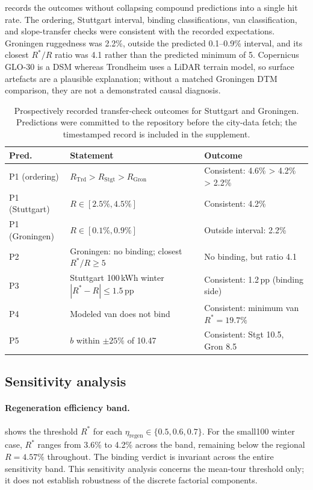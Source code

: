 \documentclass[review,3p,authoryear]{elsarticle}
\newcommand{\Rstar}{R^{*}}
\begin{document}
 records the outcomes without collapsing compound
predictions into a single hit rate.  The ordering, Stuttgart interval,
binding classifications, van classification, and slope-transfer checks
were consistent with the recorded expectations.  Groningen ruggedness was
2.2\%, outside the predicted 0.1--0.9\% interval, and its closest
$\Rstar/R$ ratio was 4.1 rather than the predicted minimum of 5.
Copernicus GLO-30 is a DSM whereas Trondheim uses a LiDAR terrain model, so
surface artefacts are a plausible explanation; without a matched Groningen
DTM comparison, they are not a demonstrated causal diagnosis.

\begin{table}[ht]
\centering
\caption{Prospectively recorded transfer-check outcomes for Stuttgart
and Groningen.  Predictions were committed to the repository before the
city-data fetch; the timestamped record is included in the supplement.}
\label{tab:predictions}
\small
\begin{tabular}{>{\raggedright\arraybackslash}p{2.4cm}
                >{\raggedright\arraybackslash}p{5.1cm}
                >{\raggedright\arraybackslash}p{4.7cm}}
\toprule
Pred.\ & Statement & Outcome \\
\midrule
P1 (ordering) & $R_{\text{Trd}} > R_{\text{Stgt}} > R_{\text{Gron}}$ & Consistent: 4.6\% > 4.2\% > 2.2\% \\
P1 (Stuttgart) & $R \in [2.5\%, 4.5\%]$ & Consistent: 4.2\% \\
P1 (Groningen) & $R \in [0.1\%, 0.9\%]$ & Outside interval: 2.2\% \\
P2 & Groningen: no binding; closest $\Rstar/R\ge5$ & No binding, but ratio 4.1 \\
P3 & Stuttgart 100\,kWh winter $|\Rstar - R| \le 1.5$\,pp & Consistent: 1.2\,pp (binding side) \\
P4 & Modeled van does not bind & Consistent: minimum van $\Rstar = 19.7\%$ \\
P5 & $b$ within $\pm 25\%$ of 10.47 & Consistent: Stgt 10.5, Gron 8.5 \\
\bottomrule
\end{tabular}
\end{table}

\subsection{Sensitivity analysis}
\label{sec:sensitivity}

\paragraph{Regeneration efficiency band.}
 shows the threshold $\Rstar$ for each
$\eta_{\text{regen}} \in \{0.5, 0.6, 0.7\}$.  For the small100 winter
case, $\Rstar$ ranges from 3.6\% to 4.2\% across the band, remaining below
the regional $R = 4.57\%$ throughout.  The binding verdict is invariant
across the entire sensitivity band.  This sensitivity analysis concerns the
mean-tour threshold only; it does not establish robustness of the discrete
factorial components.
\end{document}

